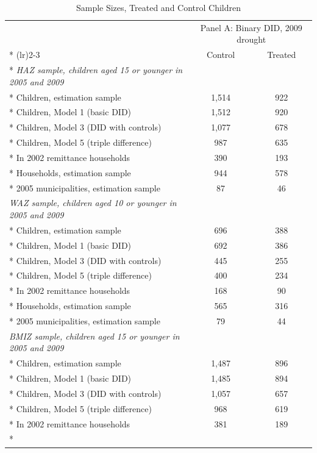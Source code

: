 \documentclass[12pt]{article}
\begin{document}
\endgroup
\clearpage
\begingroup
\footnotesize
\renewcommand{\arraystretch}{0.86}
\setlength{\tabcolsep}{4pt}
\setlength{\LTcapwidth}{\textwidth}
\setlength{\LTleft}{0pt}
\setlength{\LTright}{0pt plus 1fil}
\begin{longtable}{@{\extracolsep{\fill}}lcc}
\caption{Sample Sizes, Treated and Control Children}\\
\toprule
 & \multicolumn{2}{c}{Panel A: Binary DID, 2009 drought}\\*
\cmidrule(lr){2-3}
 & Control & Treated\\*
\midrule
\textit{HAZ sample, children aged 15 or younger in 2005 and 2009} & & \\*
Children, estimation sample & 1,514 & 922\\*
Children, Model 1 (basic DID) & 1,512 & 920\\*
Children, Model 3 (DID with controls) & 1,077 & 678\\*
Children, Model 5 (triple difference) & 987 & 635\\*
\quad In 2002 remittance households & 390 & 193\\*
Households, estimation sample & 944 & 578\\*
2005 municipalities, estimation sample & 87 & 46\\
\addlinespace[6pt]\textit{WAZ sample, children aged 10 or younger in 2005 and 2009} & & \\*
Children, estimation sample & 696 & 388\\*
Children, Model 1 (basic DID) & 692 & 386\\*
Children, Model 3 (DID with controls) & 445 & 255\\*
Children, Model 5 (triple difference) & 400 & 234\\*
\quad In 2002 remittance households & 168 & 90\\*
Households, estimation sample & 565 & 316\\*
2005 municipalities, estimation sample & 79 & 44\\
\addlinespace[6pt]\textit{BMIZ sample, children aged 15 or younger in 2005 and 2009} & & \\*
Children, estimation sample & 1,487 & 896\\*
Children, Model 1 (basic DID) & 1,485 & 894\\*
Children, Model 3 (DID with controls) & 1,057 & 657\\*
Children, Model 5 (triple difference) & 968 & 619\\*
\quad In 2002 remittance households & 381 & 189\\*

\end{longtable}
\end{document}
